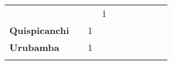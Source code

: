 \begin{tabular}{lccccccccc}
	&\cellcolor[HTML]{FCC46C}                   & \cellcolor[HTML]{FCC46C} 		 &1
	&\cellcolor[HTML]{FCC46C} 					&\cellcolor[HTML]{FCC46C}\\
	\textbf{Quispicanchi}                       
    &\cellcolor[HTML]{FCC46C}                   &1                   
	&\cellcolor[HTML]{FCC46C}                   &\cellcolor[HTML]{FCC46C}                  
	&\cellcolor[HTML]{FCC46C}                   &\cellcolor[HTML]{FCC46C} 	  &\cellcolor[HTML]{FCC46C} 					&\cellcolor[HTML]{FCC46C} 					&\cellcolor[HTML]{FCC46C}\\
	\textbf{Urubamba}                                   
	&\cellcolor[HTML]{FCC46C}                   &1                   
	&\cellcolor[HTML]{FCC46C}                   &\cellcolor[HTML]{FCC46C}                     &\cellcolor[HTML]{FCC46C}                   &\cellcolor[HTML]{FCC46C} 		 &\cellcolor[HTML]{FCC46C}					&\cellcolor[HTML]{FCC46C}      &\cellcolor[HTML]{FCC46C}\\
	&\multicolumn{1}{l}{}                       &\multicolumn{1}{l}{}            &\multicolumn{1}{l}{}                         
	&\multicolumn{1}{l}{}                       &\multicolumn{1}{l}{}            &\multicolumn{1}{l}{}                       &\multicolumn{1}{l}{}                       &\multicolumn{1}{l}{}            &\multicolumn{1}{l}{}    
\end{tabular}